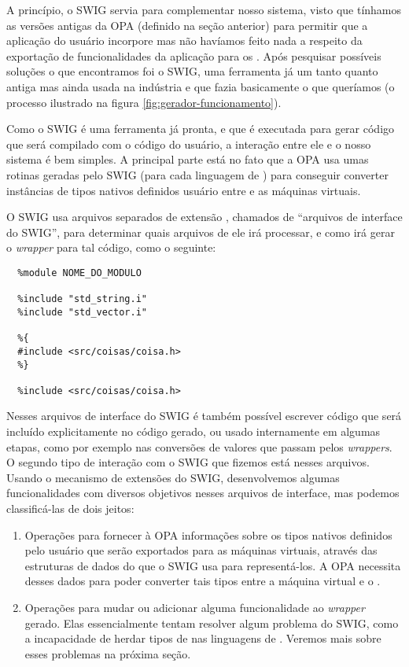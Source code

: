   A princípio, o SWIG servia para complementar nosso sistema, visto que tínhamos
  as versões antigas da OPA (definido na seção anterior) para permitir que a aplicação
  do usuário incorpore  mas não havíamos feito nada a respeito da exportação
  de funcionalidades da aplicação para os . Após pesquisar possíveis soluções
  o que encontramos foi o SWIG, uma ferramenta já um tanto quanto antiga mas ainda usada
  na indústria e que fazia basicamente o que queríamos (o processo ilustrado na figura
  \ref{fig:gerador-funcionamento}).
  
  Como o SWIG é uma ferramenta já pronta, e que é executada para gerar código que será compilado
  com o código do usuário, a interação entre ele e o nosso sistema é bem simples. A principal
  parte está no fato que a OPA usa umas rotinas geradas pelo SWIG (para cada linguagem de
  \script{}) para conseguir converter instâncias de tipos nativos definidos usuário entre
  \CXX{} e as máquinas virtuais.
  
  O SWIG usa arquivos separados de extensão , chamados de ``arquivos de interface do 
  SWIG'', para determinar quais arquivos de \CXX{} ele irá processar, e como irá gerar o 
  \textit{wrapper} para tal código, como o seguinte:
  \begin{lstlisting}
  %module NOME_DO_MODULO

  %include "std_string.i"
  %include "std_vector.i"
  
  %{
  #include <src/coisas/coisa.h>
  %}

  %include <src/coisas/coisa.h>
  \end{lstlisting}

  Nesses arquivos de interface do SWIG é também possível escrever código que será incluído
  explicitamente no código gerado, ou usado internamente em algumas etapas, como por exemplo
  nas conversões de valores que passam pelos \textit{wrappers}. O segundo tipo de interação
  com o SWIG que fizemos está nesses arquivos. Usando o mecanismo de extensões do SWIG,
  desenvolvemos algumas funcionalidades com diversos objetivos nesses arquivos de interface,
  mas podemos classificá-las de dois jeitos:

  \begin{enumerate}
    \item Operações para fornecer à OPA informações sobre os tipos nativos definidos pelo
      usuário que serão exportados para as máquinas virtuais, através das estruturas de dados
      do que o SWIG usa para representá-los. A OPA necessita desses dados para poder converter
      tais tipos entre a máquina virtual e o \CXX{}.
    \item Operações para mudar ou adicionar alguma funcionalidade ao \textit{wrapper}
      gerado. Elas essencialmente tentam resolver algum problema do SWIG, como
      a incapacidade de herdar tipos de \CXX{} nas linguagens de \script{}. Veremos mais
      sobre esses problemas na próxima seção.
  \end{enumerate}
  
